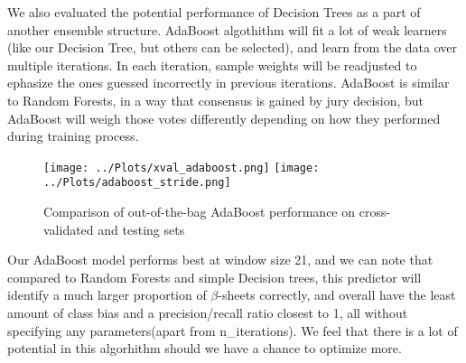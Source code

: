 \documentclass[12pt]{article}
\begin{document}
We also evaluated the potential performance of Decision Trees as a part of another ensemble structure. AdaBoost algothithm will fit a lot of weak learners (like our Decision Tree, but others can be selected), and learn from the data over multiple iterations. In each iteration, sample weights will be readjusted to ephasize the ones guessed incorrectly in previous iterations.  AdaBoost is similar to Random Forests, in a way that consensus is gained by jury decision, but AdaBoost will weigh those votes differently  depending on how they performed during training process.\\
\begin{figure}[H]
\hspace*{-0.6in}
\texttt{[image: ../Plots/xval\_adaboost.png]} 
\hspace*{-0.6in}
\texttt{[image: ../Plots/adaboost\_stride.png]} 
\caption{Comparison of out-of-the-bag AdaBoost performance on cross-validated and testing sets}
\end{figure}

\noindent Our AdaBoost model performs best at window size 21, and we can note that compared to Random Forests and simple Decision trees, this predictor will identify a much larger proportion of $\beta$-sheets correctly, and overall have the least amount of class bias and a precision/recall ratio closest to 1, all without specifying any parameters(apart from n_iterations). We feel that there is a lot of potential in this algorhithm should we have a chance to optimize more.
\end{document}

